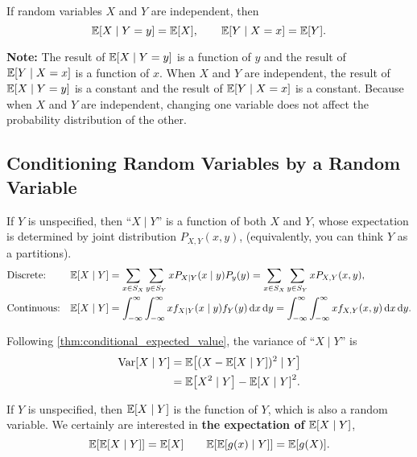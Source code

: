 \begin{theorem}
    If random variables $X$ and $Y$ are independent, then
    \[\E{X\mid Y=y}=\E{X}, \qquad \E{Y\mid X=x}=\E{Y}.\]
\end{theorem}
\textbf{Note:} The result of $\E{X\mid Y=y}$ is a function of $y$ and the result of $\E{Y\mid X=x}$ is a function of $x$. When $X$ and $Y$ are independent, the result of $\E{X\mid Y=y}$ is a constant and the result of $\E{Y\mid X=x}$ is a constant. Because when $X$ and $Y$ are independent, changing one variable does not affect the probability distribution of the other.

\subsection{Conditioning Random Variables by a Random Variable}
\begin{theorem}\label{thm:conditional_expected_value}
    If $Y$ is unspecified, then ``$X\mid Y$'' is a function of both $X$ and $Y$, whose expectation is determined by joint distribution $P_{X,Y}(x,y)$, (equivalently, you can think $Y$ as a partitions).
    \begin{align*}
        &\text{Discrete:}& \E{X\mid Y}&=\sum_{x\in S_X}\sum_{y\in S_Y}xP_{X\mid Y}(x\mid y)P_y(y)=\sum_{x\in S_X}\sum_{y\in S_Y}xP_{X, Y}(x, y), \\
        &\text{Continuous:}& \E{X\mid Y}&=\int_{-\infty}^{\infty}\int_{-\infty}^{\infty}xf_{X\mid Y}(x\mid y)f_Y(y)\diff x\diff y=\int_{-\infty}^{\infty}\int_{-\infty}^{\infty}xf_{X, Y}(x, y)\diff x\diff y.
    \end{align*}
\end{theorem}

\begin{theorem}
    Following \cref{thm:conditional_expected_value}, the variance of ``$X\mid Y$'' is
    \begin{align*}
        \Var[X\mid Y]
        &= \E{(X-\E{X\mid Y})^2\mid Y} \\
        &= \E{X^2\mid Y}-\E{X\mid Y}^2 .
    \end{align*}
\end{theorem}

\begin{theorem}
    \label{thm:iterated_expectation}
    If $Y$ is unspecified, then $\E{X\mid Y}$ is the function of $Y$, which is also a random variable. We certainly are interested in \textbf{the expectation of} $\E{X\mid Y}$,
    \[\E{\E{X\mid Y}}=\E{X} \qquad \E{\E{g(x)\mid Y}}=\E{g(X)}.\]
\end{theorem}

